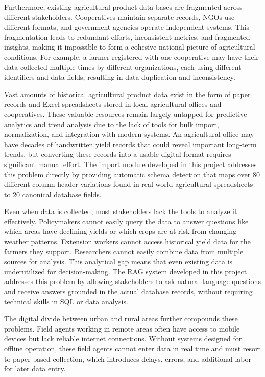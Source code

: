 \documentclass[12pt,a4paper,oneside]{report}
\begin{document}
Furthermore, existing agricultural product data bases are fragmented across different stakeholders. Cooperatives maintain separate records, NGOs use different formats, and government agencies operate independent systems. This fragmentation leads to redundant efforts, inconsistent metrics, and fragmented insights, making it impossible to form a cohesive national picture of agricultural conditions. For example, a farmer registered with one cooperative may have their data collected multiple times by different organizations, each using different identifiers and data fields, resulting in data duplication and inconsistency.

Vast amounts of historical agricultural product data exist in the form of paper records and Excel spreadsheets stored in local agricultural offices and cooperatives. These valuable resources remain largely untapped for predictive analytics and trend analysis due to the lack of tools for bulk import, normalization, and integration with modern systems. An agricultural office may have decades of handwritten yield records that could reveal important long-term trends, but converting these records into a usable digital format requires significant manual effort. The import module developed in this project addresses this problem directly by providing automatic schema detection that maps over 80 different column header variations found in real-world agricultural spreadsheets to 20 canonical database fields.

Even when data is collected, most stakeholders lack the tools to analyze it effectively. Policymakers cannot easily query the data to answer questions like which areas have declining yields or which crops are at risk from changing weather patterns. Extension workers cannot access historical yield data for the farmers they support. Researchers cannot easily combine data from multiple sources for analysis. This analytical gap means that even existing data is underutilized for decision-making. The RAG system developed in this project addresses this problem by allowing stakeholders to ask natural language questions and receive answers grounded in the actual database records, without requiring technical skills in SQL or data analysis.

The digital divide between urban and rural areas further compounds these problems. Field agents working in remote areas often have access to mobile devices but lack reliable internet connections. Without systems designed for offline operation, these field agents cannot enter data in real time and must resort to paper-based collection, which introduces delays, errors, and additional labor for later data entry.
\end{document}
